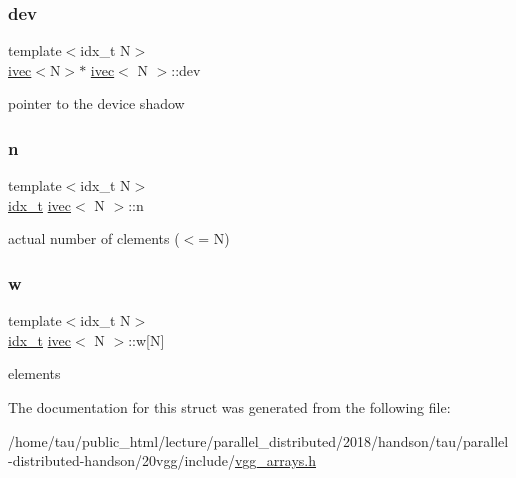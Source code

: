 \subsubsection{\texorpdfstring{dev}{dev}}
{\footnotesize\ttfamily template$<$idx\+\_\+t N$>$ \\
\hyperlink{structivec}{ivec}$<$N$>$$\ast$ \hyperlink{structivec}{ivec}$<$ N $>$\+::dev}

pointer to the device shadow \mbox{\label{structivec_ad067032ec2cffe11fddfa932aa2380d1}} 
\subsubsection{\texorpdfstring{n}{n}}
{\footnotesize\ttfamily template$<$idx\+\_\+t N$>$ \\
\hyperlink{vgg__util_8h_a8e93478a00e685bea5e6a3f617bf03a3}{idx\+\_\+t} \hyperlink{structivec}{ivec}$<$ N $>$\+::n}

actual number of clements ($<$= N) \mbox{\label{structivec_a8abb4460bee21f081dda79fce44f0dfc}} 
\subsubsection{\texorpdfstring{w}{w}}
{\footnotesize\ttfamily template$<$idx\+\_\+t N$>$ \\
\hyperlink{vgg__util_8h_a8e93478a00e685bea5e6a3f617bf03a3}{idx\+\_\+t} \hyperlink{structivec}{ivec}$<$ N $>$\+::w\mbox{[}N\mbox{]}}

elements 

The documentation for this struct was generated from the following file\+:\begin{DoxyCompactItemize}
\item 
/home/tau/public\+\_\+html/lecture/parallel\+\_\+distributed/2018/handson/tau/parallel-\/distributed-\/handson/20vgg/include/\hyperlink{vgg__arrays_8h}{vgg\+\_\+arrays.\+h}\end{DoxyCompactItemize}
